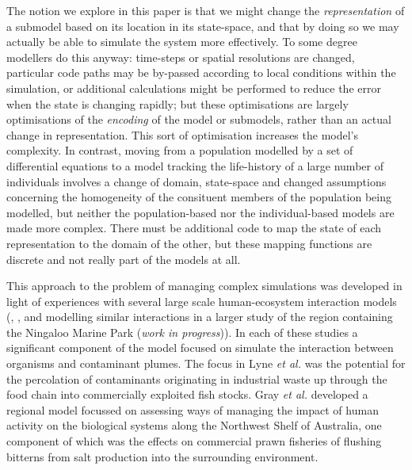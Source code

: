 \documentclass[preprint,authoryear,5p,twocolumn]{elsarticle}
\begin{document}
The notion we explore in this paper is that we might change the {\em{representation}} of a submodel based on its
location in its state-space, and that by doing so we may actually be able to simulate the system more effectively. To
some degree modellers do this anyway: time-steps or spatial resolutions are changed, particular code paths may be
by-passed according to local conditions within the simulation, or additional calculations might be performed to reduce
the error when the state is changing rapidly; but these optimisations are largely optimisations of the
{\em{encoding}} of the model or submodels, rather than an actual change in representation. This sort of optimisation
increases the model's complexity. In contrast, moving from a population modelled by a set of differential equations to
a model tracking the life-history of a large number of individuals involves a change of domain, state-space and changed
assumptions concerning the homogeneity of the consituent members of the population being modelled, but neither the
population-based nor the individual-based models are made more complex. There must be additional code to map the state
of each representation to the domain of the other, but these mapping functions are discrete and not really part of the
models at all.

This approach to the problem of managing complex simulations was developed in light of experiences with several large
scale human-ecosystem interaction models (\citet{Lyne94:1}, \citet{Gray06:1}, and modelling similar interactions in a
larger study of the region containing the Ningaloo Marine Park ({\em{work in progress}})). In each of these studies a
significant component of the model focused on simulate the interaction between organisms and contaminant plumes. The
focus in Lyne {\em{et al.}} was the potential for the percolation of contaminants originating in industrial waste up
through the food chain into commercially exploited fish stocks. Gray {\em{et al.}} developed a regional model
focussed on assessing ways of managing the impact of human activity on the biological systems along the Northwest Shelf
of Australia, one component of which was the effects on commercial prawn fisheries of flushing bitterns from salt
production into the surrounding environment.
\end{document}
